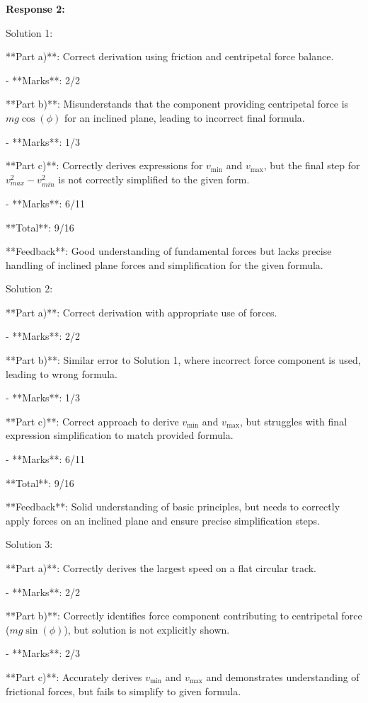 \documentclass[a4paper,11pt]{article}
\begin{document}
\bigskip
\textbf{Response 2:}

Solution 1:

**Part a)**: Correct derivation using friction and centripetal force balance. 

- **Marks**: 2/2

**Part b)**: Misunderstands that the component providing centripetal force is \(mg \cos(\phi)\) for an inclined plane, leading to incorrect final formula.

- **Marks**: 1/3

**Part c)**: Correctly derives expressions for \(v_{\text{min}}\) and \(v_{\text{max}}\), but the final step for \(v_{max}^{2} - v_{min}^{2}\) is not correctly simplified to the given form.

- **Marks**: 6/11

**Total**: 9/16

**Feedback**: Good understanding of fundamental forces but lacks precise handling of inclined plane forces and simplification for the given formula.

Solution 2:

**Part a)**: Correct derivation with appropriate use of forces.

- **Marks**: 2/2

**Part b)**: Similar error to Solution 1, where incorrect force component is used, leading to wrong formula.

- **Marks**: 1/3

**Part c)**: Correct approach to derive \(v_{\text{min}}\) and \(v_{\text{max}}\), but struggles with final expression simplification to match provided formula.

- **Marks**: 6/11

**Total**: 9/16

**Feedback**: Solid understanding of basic principles, but needs to correctly apply forces on an inclined plane and ensure precise simplification steps.

Solution 3:

**Part a)**: Correctly derives the largest speed on a flat circular track.

- **Marks**: 2/2

**Part b)**: Correctly identifies force component contributing to centripetal force (\(mg \sin(\phi)\)), but solution is not explicitly shown.

- **Marks**: 2/3

**Part c)**: Accurately derives \(v_{\text{min}}\) and \(v_{\text{max}}\) and demonstrates understanding of frictional forces, but fails to simplify to given formula.
\end{document}
